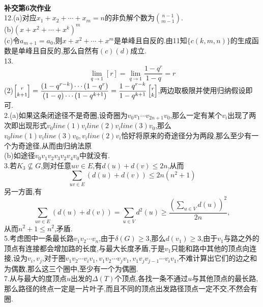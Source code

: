\documentclass[b5paper]{ctexart}
\newcommand{\qa}[2]{\left[ \substack{\vspace{1pt}\\#1\vspace{3pt}\\#2\vspace{1pt}}\right]}
\begin{document}
\pagestyle{plain}
\noindent
\\
\textbf{补交第6次作业}\\
12.(a)对应$x_1+x_2+\cdots+x_m=n$的非负解个数为$\binom{n-1}{m-1}$.\\
(b)$(x+x^2+\cdots+x^k)^m$\\
(c)令$a_{m+1}=a_0$,则$x+x^2+\cdots+x^m$是单峰且自反的.由11知$\{c(k,m,n)\}$的生成函数是单峰且自反的,那么自然有$(c)(d)$成立.\\
13.\[\lim_{q\to 1}\left[ r\right]=\lim_{q\to 1}\dfrac{1-q^r}{1-q}=r\]
(2)$\qa{r}{k+1}=\dfrac{(1-q^{r-k})\cdots(1-q^r)}{(1-q)\cdots(1-q^{k+1})}=\dfrac{1-q^{r-k}}{1-q^{k+1}}\qa{r}{k}$,两边取极限并使用归纳假设即可.\\
2.(a)如果这条闭途径不是奇圈,设奇圈为$v_0v_1\cdots v_{2n+1}v_0$,那么一定有某个$v_i$出现了两次即出现形式$v_0line(1)v_iline(2)v_iline(3)v_0$,那么$v_0line(1)v_iline(3)v_0,v_iline(2)v_i$恰好将原来的奇途径分为两段,那么至少有一个为奇途径,从而由归纳法原\\
(b)如途径$v_0v_1v_2v_3v_2v_4v_0$中就没有.\\
3.若$K_3\not\subseteq G$,则对任意$uv\in E$,有$d(u)+d(v)\leq 2n$,从而
\[\sum_{uv\in E}(d(u)+d(v))\leq 2n(n^2+1)\]
另一方面,有
\[\sum_{uv\in E}(d(u)+d(v))=\sum_{u\in V}d^2(u)\geq \dfrac{\left( \sum_{u\in V}d(u)\right)^2}{2n},\]
从而$n^2+1\leq n^2$,矛盾.\\
5.考虑图中一条最长路$v_1v_2\cdots v_n$,由于$\delta(G)\geq 3$,那么$d(v_1)\geq 3$,由于$v_1$与路之外的顶点有连接都会增加路的长度,与最大长度矛盾,于是$v_1$只能和路中其他的顶点向连接,设为$v_i,v_j$,对于圈$v_1v_2\cdots v_iv_1,v_1v_2\cdots v_jv_1,v_1v_jv_{j-1}\cdots v_iv_1$,不难计算出它们的边之和为偶数,那么这三个圈中,至少有一个为偶圈.\\
7.从与最大的度顶点$u$出发的$\Delta(T)$个顶点,各找一条不通过$u$与其他顶点的最长路,那么路径的终点一定是一片叶子,而且不同的顶点出发路径顶点一定不交,不然会有圈.\\
\end{document}
